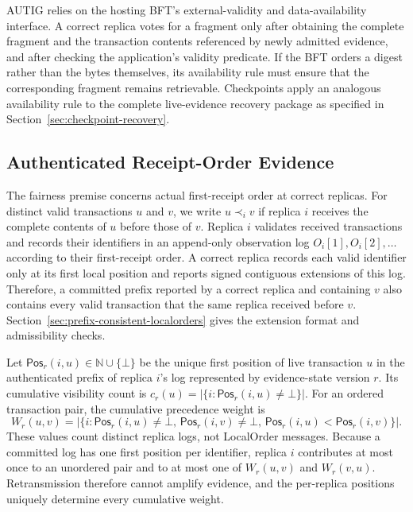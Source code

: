 AUTIG relies on the hosting BFT's external-validity and data-availability
interface.  A correct replica votes for a fragment only after obtaining the
complete fragment and the transaction contents referenced by newly admitted
evidence, and after checking the application's validity predicate.  If the BFT
orders a digest rather than the bytes themselves, its availability rule must
ensure that the corresponding fragment remains retrievable.  Checkpoints apply
an analogous availability rule to the complete live-evidence recovery package
as specified in Section~\ref{sec:checkpoint-recovery}.

\subsection{Authenticated Receipt-Order Evidence}
\label{sec:receipt-order-evidence}

The fairness premise concerns actual first-receipt order at correct replicas.
For distinct valid transactions $u$ and $v$, we write $u\prec_i v$ if replica
$i$ receives the complete contents of $u$ before those of $v$.  Replica
$i$ validates received transactions and records their identifiers in an append-only observation log
$O_i[1],O_i[2],\ldots$ according to their first-receipt order. A correct
replica records each valid identifier only at its first local position and
reports signed contiguous extensions of this log. 
Therefore, a committed prefix reported by a correct replica and containing
$v$ also contains every valid transaction that the same replica received before
$v$.  Section~\ref{sec:prefix-consistent-localorders} gives the extension
format and admissibility checks.

Let $\mathsf{Pos}_r(i,u)\in\mathbb N\cup\{\bot\}$ be the unique first
position of live transaction $u$ in the authenticated prefix of replica $i$'s
log represented by evidence-state version $r$.  Its cumulative visibility
count is $c_r(u)=|\{i:\mathsf{Pos}_r(i,u)\ne\bot\}|$.
For an ordered transaction pair, the cumulative precedence weight is
\begin{equation}
 W_r(u,v)=\bigl|\{i:\mathsf{Pos}_r(i,u)\ne\bot,\,
 \mathsf{Pos}_r(i,v)\ne\bot,\,
 \mathsf{Pos}_r(i,u)<\mathsf{Pos}_r(i,v)\}\bigr|.
 \label{eq:position-weight}
\end{equation}
These values count distinct replica logs, not LocalOrder messages.  Because a
committed log has one first position per identifier, replica $i$ contributes at
most once to an unordered pair and to at most one of $W_r(u,v)$ and
$W_r(v,u)$.  Retransmission therefore cannot amplify evidence, and the
per-replica positions uniquely determine every cumulative weight.

